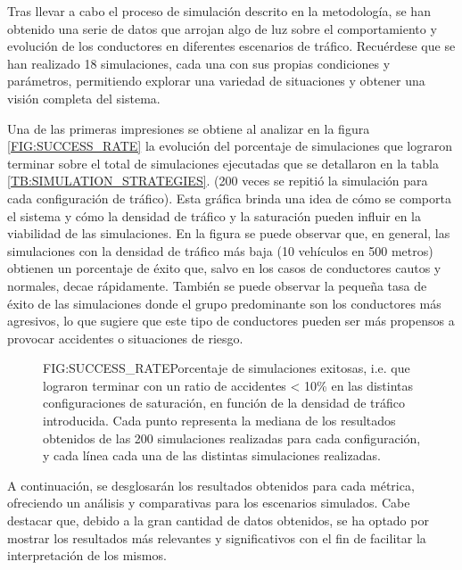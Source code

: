 Tras llevar a cabo el proceso de simulación descrito en la metodología, se han obtenido
una serie de datos que arrojan algo de luz sobre el comportamiento y evolución de los
conductores en diferentes escenarios de tráfico. Recuérdese que se han realizado 18 simulaciones,
cada una con sus propias condiciones y parámetros, permitiendo explorar una variedad de situaciones y obtener una visión completa del sistema.

Una de las primeras impresiones se obtiene al analizar en la figura \ref{FIG:SUCCESS_RATE} la evolución del porcentaje de
simulaciones que lograron terminar sobre el total de simulaciones ejecutadas que se detallaron en la tabla \ref{TB:SIMULATION_STRATEGIES}.
(200 veces se repitió la simulación para cada configuración de tráfico). Esta gráfica brinda una idea de cómo se comporta el sistema
y cómo la densidad de tráfico y la saturación pueden influir en la viabilidad de las simulaciones.
En la figura se puede observar que, en general, las simulaciones con la densidad de tráfico más baja
(10 vehículos en 500 metros) obtienen un porcentaje de éxito que, salvo en los casos de conductores cautos y normales,
decae rápidamente. También se puede observar la pequeña tasa de éxito de las simulaciones donde el grupo predominante
son los conductores más agresivos, lo que sugiere que este tipo de conductores pueden ser más propensos a
provocar accidentes o situaciones de riesgo.

\begin{figure}[Simulaciones exitosas]{FIG:SUCCESS_RATE}{Porcentaje de simulaciones exitosas, i.e. que lograron terminar con un ratio de accidentes < 10\% en
    las distintas configuraciones de saturación, en función de la densidad de tráfico introducida. Cada punto representa la mediana de los resultados obtenidos
    de las 200 simulaciones realizadas para cada configuración, y cada línea cada una de las distintas simulaciones realizadas.}
\end{figure}

A continuación, se desglosarán los resultados obtenidos para cada métrica, ofreciendo un análisis y comparativas
para los escenarios simulados. Cabe destacar que, debido a la gran cantidad de datos obtenidos, se ha optado por
mostrar los resultados más relevantes y significativos con el fin de facilitar la interpretación de los mismos.